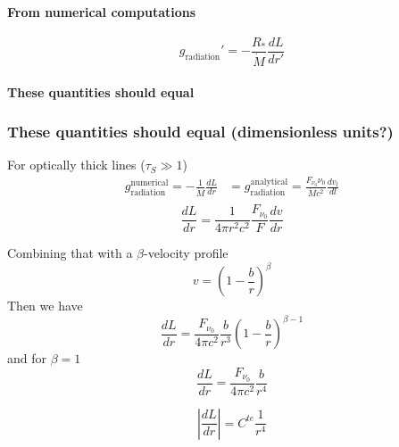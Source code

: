 \documentclass[../main/main.tex]{subfiles}
\begin{document}
\paragraph{From numerical computations}
\begin{equation}
g_{\text{radiation}}' = - \frac{R_*}{\dot{M}}\frac{dL}{dr'}
\end{equation}

\paragraph{These quantities should equal}

\newpage
\subsubsection{These quantities should equal (dimensionless units?)}
For optically thick lines ($\tau_S \gg 1$)
\begin{equation}
\begin{aligned}
g_{\text{radiation}}^{\text{numerical}} = -\frac{1}{\dot{M}} \frac{dL}{dr} &= g_{\text{radiation}}^{\text{analytical}} = \frac{F_{\nu_0} \nu_0 }{\dot{M} c^2} \frac{dv_l}{dl} \\
\end{aligned}
\end{equation}
\begin{equation}
\frac{dL}{dr} = \frac{1}{4 \pi r^2 c^2} \frac{F_{\nu_0}}{F} \frac{dv}{dr}
\end{equation}

Combining that with a $\beta$-velocity profile
\begin{equation}
v = \left( 1 - \frac{b}{r} \right)^{\beta} 
\end{equation}
Then we have 
\begin{equation}
\boxed{\frac{dL}{dr} = \frac{F_{\nu_0}}{4 \pi c^2} \frac{b}{r^3} \left( 1-\frac{b}{r}\right)^{\beta - 1}}
\end{equation}
and for $\beta = 1$
\begin{equation}
\frac{dL}{dr} = \frac{F_{\nu_0}}{4 \pi c^2} \frac{b}{r^4} 
\end{equation}

\begin{equation}
\left| \frac{dL}{dr} \right| = C^{te}\frac{1}{r^4}
\end{equation}

\newpage
\end{document}
